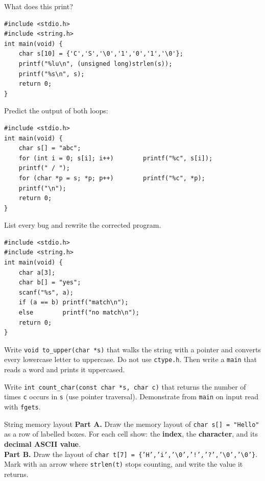 \documentclass[11pt]{article}
\begin{document}
\begin{trace}
What does this print?
\begin{lstlisting}
#include <stdio.h>
#include <string.h>
int main(void) {
    char s[10] = {'C','S','\0','1','0','1','\0'};
    printf("%lu\n", (unsigned long)strlen(s));
    printf("%s\n", s);
    return 0;
}
\end{lstlisting}
\end{trace}

\begin{trace}
Predict the output of both loops:
\begin{lstlisting}
#include <stdio.h>
int main(void) {
    char s[] = "abc";
    for (int i = 0; s[i]; i++)        printf("%c", s[i]);
    printf(" / ");
    for (char *p = s; *p; p++)        printf("%c", *p);
    printf("\n");
    return 0;
}
\end{lstlisting}
\end{trace}

\begin{bug}[Comparing strings with \texttt{==} and buffer too small]
List every bug and rewrite the corrected program.
\begin{lstlisting}
#include <stdio.h>
#include <string.h>
int main(void) {
    char a[3];
    char b[] = "yes";
    scanf("%s", a);
    if (a == b) printf("match\n");
    else        printf("no match\n");
    return 0;
}
\end{lstlisting}
\end{bug}

\begin{writecode}
Write \texttt{void to\_upper(char *s)} that walks the string with a pointer and converts
every lowercase letter to uppercase. Do not use \texttt{ctype.h}. Then write a \texttt{main}
that reads a word and prints it uppercased.
\end{writecode}

\begin{writecode}
Write \texttt{int count\_char(const char *s, char c)} that returns the number of times
\texttt{c} occurs in \texttt{s} (use pointer traversal). Demonstrate from \texttt{main}
on input read with \texttt{fgets}.
\end{writecode}

\begin{drawex}{String memory layout}
\textbf{Part A.} Draw the memory layout of \texttt{char s[] = "Hello"} as a row of
labelled boxes. For each cell show: the \textbf{index}, the \textbf{character},
and its \textbf{decimal ASCII value}.\\[6pt]
\textbf{Part B.} Draw the layout of \texttt{char t[7] = \{'H','i','\textbackslash{}0','!','?','\textbackslash{}0','\textbackslash{}0'\}}.
Mark with an arrow where \texttt{strlen(t)} stops counting, and write the value it returns.
\end{drawex}
\end{document}
